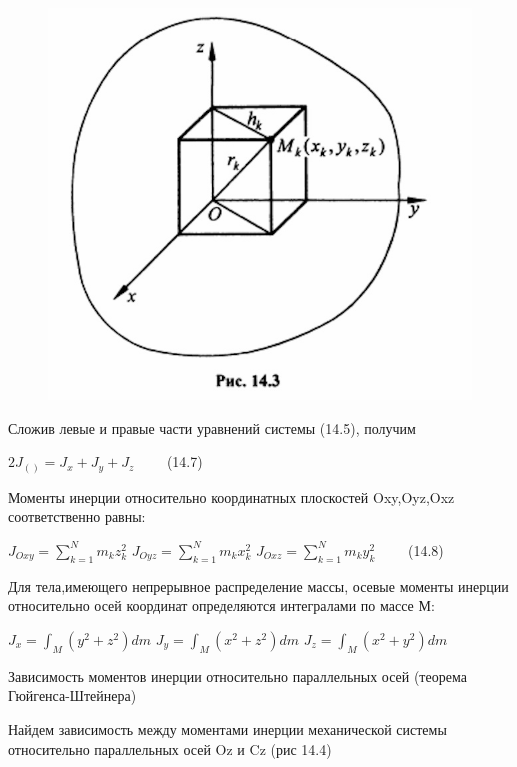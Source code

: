 {\begin{center}
    \begin{figure}[H]
        \centering\includegraphics[scale=0.3]{img/14.3.jpeg} 
    \end{figure}
    \par Сложив левые и правые части уравнений системы (14.5), получим 
    \par $ 2J_{()} = J_x + J_y + J_z \qquad$ (14.7)
    \par Моменты инерции относительно координатных плоскостей Oxy,Oyz,Oxz соответственно равны:
    \par ${J_{Oxy}} = {\sum_{k=1}^N {m_k z_k^2}}$  ${J_{Oyz}} = {\sum_{k=1}^N {m_k x_k^2}}$  ${J_{Oxz}} = {\sum_{k=1}^N {m_k y_k^2}}\qquad$ (14.8)
    \par Для тела,имеющего непрерывное распределение массы, осевые моменты инерции относительно осей координат определяются интегралами по массе М:
    \par $ J_x = \int_{M} (y^2+z^2)dm$ $ J_y =\int_{M} (x^2+z^2)dm$ $ J_z = \int_{M} (x^2+y^2)dm$
    \par
    \par Зависимость моментов инерции относительно параллельных осей (теорема Гюйгенса-Штейнера)
    \par
    \par Найдем зависимость между моментами инерции механической системы относительно параллельных осей Oz и Cz (рис 14.4)
    \begin{figure}[H]

\end{figure}
\end{center}}
